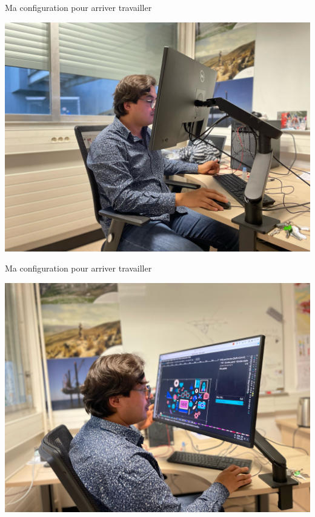 \documentclass{beamer}
\begin{document}
\begin{frame}
 {Ma configuration pour arriver travailler}
 
  \includegraphics[width=1\linewidth]{images/photos/2/image2.jpeg}  
 
\end{frame}


\begin{frame}
 {Ma configuration pour arriver travailler}
 
  \includegraphics[width=1\linewidth]{images/photos/2/image4.jpeg}  
 
\end{frame}
\end{document}
